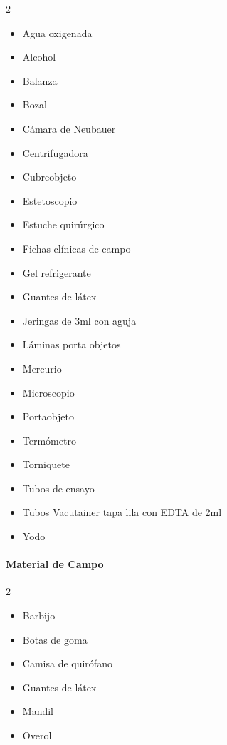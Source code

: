 \begin{center}
	\vspace{0.5cm}
	\begin{minipage}{\linewidth}
		\begin{multicols}{2}
			\begin{itemize}[label={\textbullet}, left=0pt, itemsep=0pt, topsep=0pt, parsep=0pt, partopsep=0pt]
				\item Agua oxigenada
				\item Alcohol
				\item Balanza
				\item Bozal
				\item Cámara de Neubauer
				\item Centrifugadora
				\item Cubreobjeto
				\item Estetoscopio
				\item Estuche quirúrgico
				\item Fichas clínicas de campo
				\item Gel refrigerante
				\item Guantes de látex
				\item Jeringas de 3ml con aguja
				\item Láminas porta objetos
				\item Mercurio
				\item Microscopio
				\item Portaobjeto
				\item Termómetro
				\item Torniquete
				\item Tubos de ensayo
				\item Tubos Vacutainer tapa lila con EDTA de 2ml
				\item Yodo
			\end{itemize}
		\end{multicols}
	\end{minipage}
\end{center}

\vspace{0.5cm}

\paragraph*{Material de Campo}

\begin{center}
	\begin{minipage}{\linewidth}
		\begin{multicols}{2}
			\begin{itemize}[label={\textbullet}, left=0pt, itemsep=0pt, topsep=0pt, parsep=0pt, partopsep=0pt]
				\item Barbijo
				\item Botas de goma
				\item Camisa de quirófano
				\item Guantes de látex
				\item Mandil
				\item Overol
			\end{itemize}
		\end{multicols}
	\end{minipage}
\end{center}
